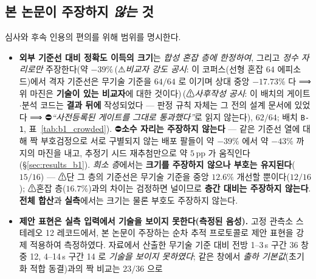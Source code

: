 \documentclass[11pt]{report}
\numberwithin{equation}{chapter}
\numberwithin{figure}{chapter}
\numberwithin{table}{chapter}
\newcommand{\BOnePostHoc}{\,(⚠\emph{사후작성 공시}: 이 배치의 게이트$\cdot$분석
  코드는 \textbf{결과 뒤에} 작성되었다 --- 판정 규칙 자체는 그 전의 설계 문서에
  있었다 ⟹ ⛔\emph{``사전등록된 게이트를 그대로 통과했다''}로 읽지 않는다)}
\newcommand{\CmpSkillBOne}{\,(⚠\emph{비교자 강도 공시}: 이 코퍼스(선형 혼잡 $64$
  에피소드)에서 격자 기준선은 무기술 기준을 $64/64$ 로 이기며 상대 중앙 $-17.73\%$ 다
  ⟹ 위 마진은 \textbf{기술이 있는 비교자}에 대한 것이다)}
\begin{document}
\subsection*{본 논문이 주장하지 \emph{않는} 것}
\label{sec:contrib-limits}

심사와 후속 인용의 편의를 위해 범위를 명시한다.

\begin{itemize}
  \item \textbf{외부 기준선 대비 정확도 이득의 크기}는 \emph{합성 혼잡 층에 한정하여},
        그리고 \emph{정수 자리로만} 주장한다(약 $-39\%$\CmpSkillBOne{}\BOnePostHoc{}, $62/64$; 배치 \texttt{B-1},
        표~\ref{tab:b1_crowded}).
        ⛔\textbf{소수 자리는 주장하지 않는다} --- 같은 기준선 열에 대해 짝 부호검정으로
        서로 구별되지 않는 배포 팔들이 약 $-39\%$ 에서 약 $-43\%$ 까지의 마진을 내고, 추정기 시드
        재추첨만으로 약 $5$\,pp 가 움직인다(\S\ref{sec:results_b1}).
        \emph{희소 층}에서는 \textbf{크기를 주장하지 않으나 부호는 유지된다}($15/16$) ---
        ⚠단 그 층의 기준선은 무기술 기준을 중앙 $12.6\%$ 개선할 뿐이다($12/16$);
        ⚠혼잡 층($16.7\%$)과의 차이는 검정하면 널이므로 \textbf{층간 대비는 주장하지 않는다}.
        \textbf{전체 합산}과 \textbf{실측}에서는 크기는 물론 부호도 주장하지 않는다.
  \item \textbf{제안 표현은 실측 입력에서 기술을 보이지 못한다(측정된 음성).}
        고정 관측소 스테레오 12 레코드에서, 본 논문이 주장하는 순차 추적 프로토콜로
        제안 표현을 강제 적용하여 측정하였다. 자료에서 산출한 무기술 기준 대비
        전방 1--3\,s 구간 36 창 중 12, 4--14\,s 구간 14 로 \emph{기술을 보이지 못하였다};
        같은 창에서 \emph{출하 기본값}(초기화 적합 동결)과의 짝 비교는 $23/36$ 으로

\end{itemize}
\end{document}
